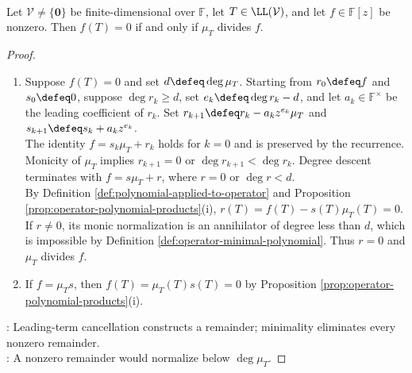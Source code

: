 \begin{theorem} \label{thm:operator-annihilator-iff-multiple-minimal-polynomial} \\
Let $\mathcal{V}\neq\{\mathbf{0}\}$ be finite-dimensional over $\mathbb{F}$, let $T\in\LL(\mathcal{V})$, and let $f\in\mathbb{F}[z]$ be nonzero. Then $f(T)=0$ if and only if $\mu_T$ divides $f$.
\begin{proof}
\begin{enumerate}[label=\roman*.]
\setlength{\itemsep}{0pt}
\item[$(\Rightarrow)$] Suppose $f(T)=0$ and set $d\defeq\deg\mu_T$. Starting from $r_0\defeq f$ and $s_0\defeq0$, suppose $\deg r_k\geq d$, set $e_k\defeq\deg r_k-d$, and let $a_k\in\mathbb{F}^{\times}$ be the leading coefficient of $r_k$. Set $r_{k+1}\defeq r_k-a_kz^{e_k}\mu_T$ and $s_{k+1}\defeq s_k+a_kz^{e_k}$.\\
The identity $f=s_k\mu_T+r_k$ holds for $k=0$ and is preserved by the recurrence.\\
Monicity of $\mu_T$ implies $r_{k+1}=0$ or $\deg r_{k+1}<\deg r_k$. Degree descent terminates with $f=s\mu_T+r$, where $r=0$ or $\deg r<d$.\\
By Definition \ref{def:polynomial-applied-to-operator} and Proposition \ref{prop:operator-polynomial-products}(i), $r(T)=f(T)-s(T)\mu_T(T)=0$. If $r\neq0$, its monic normalization is an annihilator of degree less than $d$, which is impossible by Definition \ref{def:operator-minimal-polynomial}. Thus $r=0$ and $\mu_T$ divides $f$.
\item[$(\Leftarrow)$] If $f=\mu_Ts$, then $f(T)=\mu_T(T)s(T)=0$ by Proposition \ref{prop:operator-polynomial-products}(i).
\end{enumerate}
: Leading-term cancellation constructs a remainder; minimality eliminates every nonzero remainder.\\
: A nonzero remainder would normalize below $\deg\mu_T$.
\end{proof}
\end{theorem}

